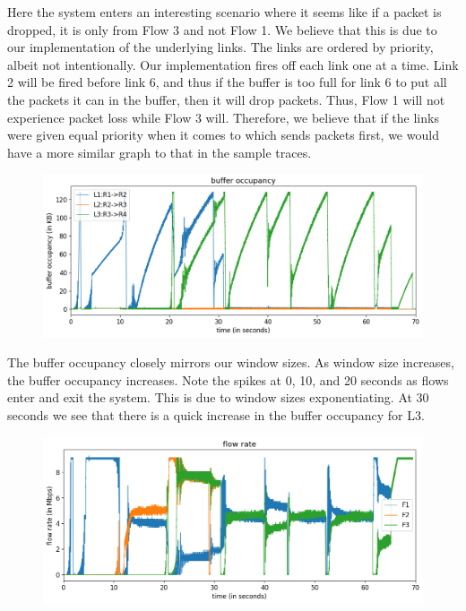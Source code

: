 \documentclass{article}
\begin{document}
Here the system enters an interesting scenario where it seems like if a packet is dropped, it is only from Flow 3 and not Flow 1. We believe that this is due to our implementation of the underlying links. The links are ordered by priority, albeit not intentionally. Our implementation fires off each link one at a time. Link 2 will be fired before link 6, and thus if the buffer is too full for link 6 to put all the packets it can in the buffer, then it will drop packets. Thus, Flow 1 will not experience packet loss while Flow 3 will. Therefore, we believe that if the links were given equal priority when it comes to which sends packets first, we would have a more similar graph to that in the sample traces.

\begin{figure}[H]
\centering
\includegraphics[width = \textwidth]{"test_case2_reno buffer occupancy"}
\end{figure}

The buffer occupancy closely mirrors our window sizes. As window size increases, the buffer occupancy increases. Note the spikes at 0, 10, and 20 seconds as flows enter and exit the system. This is due to window sizes exponentiating. At 30 seconds we see that there is a quick increase in the buffer occupancy for L3.

\begin{figure}[H]
\centering
\includegraphics[width = \textwidth]{"test_case2_reno flow rate"}
\end{figure}
\end{document}
